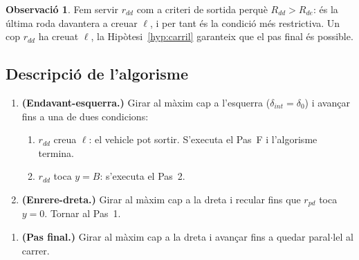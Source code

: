 \documentclass[11pt, a4paper]{article}
\theoremstyle{plain}
\theoremstyle{definition}
\newtheorem{remark}[theorem]{Observaci\'o}
\begin{document}
\begin{remark}
Fem servir $r_{dd}$ com a criteri de sortida perqu\`e $R_{dd}>R_{de}$:
\'es la \'ultima roda davantera a creuar $\ell$, i per tant \'es la condici\'o
m\'es restrictiva. Un cop $r_{dd}$ ha creuat $\ell$, la
Hip\`otesi~\ref{hyp:carril} garanteix que el pas final \'es possible.
\end{remark}

\subsection{Descripci\'o de l'algorisme}

\begin{enumerate}[label=\textbf{Pas \arabic*.},leftmargin=*,noitemsep]
\item \textbf{(Endavant-esquerra.)} Girar al m\`axim cap a l'esquerra
  ($\delta_{int}=\delta_0$) i avan\c{c}ar fins a una de dues condicions:
  \begin{enumerate}[label=(\alph*),noitemsep]
    \item $r_{dd}$ creua $\ell$: el vehicle pot sortir.
          S'executa el Pas~F i l'algorisme termina.
    \item $r_{dd}$ toca $y=B$: s'executa el Pas~2.
  \end{enumerate}
\item \textbf{(Enrere-dreta.)} Girar al m\`axim cap a la dreta i recular
  fins que $r_{pd}$ toca $y=0$. Tornar al Pas~1.
\end{enumerate}
\begin{enumerate}[label=\textbf{Pas F.},leftmargin=*]
\item[]\textbf{(Pas final.)} Girar al m\`axim cap a la dreta i avan\c{c}ar
  fins a quedar paral$\cdot$lel al carrer.
\end{enumerate}
\end{document}
